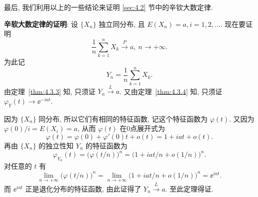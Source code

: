 最后, 我们利用以上的一些结论来证明 \ref{sec:4.2} 节中的辛钦大数定律.

\textbf{辛软大数定律的证明}:
设 $ \{ X_n \} $ 独立同分布, 且 $ E (X_n) = a, i=1, 2, \dotsc $.
现在要证明
\begin{equation*}
    \frac{1}{n} \sum_{k=1}^n X_k \stackrel{P}{\to} a, \ n \to +\infty.
\end{equation*}
为此记
\begin{equation*}
    Y_n = \frac{1}{n} \sum_{k=1}^n X_k.
\end{equation*}
由定理~\ref{thm:4.3.3} 知, 只须证 $ Y_n \stackrel{L}{\to} a $.
又由定理~\ref{thm:4.3.4} 知, 只须证 $ \varphi_Y (t) \to \ee^{-iat} $.

因为 $ \{ X_n \} $ 同分布, 所以它们有相同的特征函数, 记这个特征函数为 $ \varphi (t) $.
又因为 $ \varphi(0) / i = E ( X_i ) = a $, 从而 $ \varphi (t) $ 在0点展开式为
\begin{equation*}
    \varphi (t) = \varphi (0) + \varphi' (0) t + o (t) = 1 + iat + o (t).
\end{equation*}
再由 $ \{ X_n \} $ 的独立性知 $ Y_n $ 的特征函数为
\begin{equation*}
    \varphi_{Y_n} (t) = \bigl( \varphi ( t / n) \bigr)^n = \bigl( 1 + iat/n + o (1/n) \bigr)^n.
\end{equation*}
对任意的 $ t $ 有
\begin{equation*}
    \lim_{n \to +\infty} \bigl( \varphi ( t / n) \bigr)^n = \lim_{n \to +\infty} \bigl( 1 + iat/n + o (1/n) \bigr)^n = \ee^{iat}.
\end{equation*}
而 $ \ee^{iat} $ 正是退化分布的特征函数, 由此证得了 $ Y_n \stackrel{L}{\to} a $.
至此定理得证.

